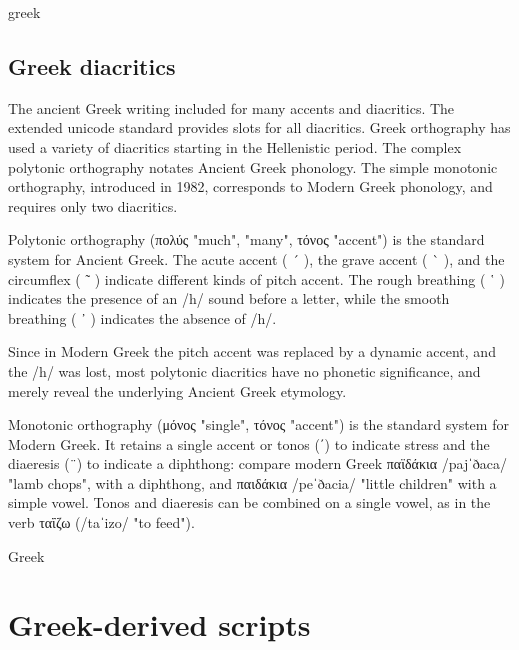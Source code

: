 {\small
\begin{scriptexample}{greek}
\end{scriptexample}
}

\subsection{Greek diacritics}

The ancient Greek writing included for many accents and diacritics. The extended unicode standard provides slots for all diacritics. Greek orthography has used a variety of diacritics starting in the Hellenistic period. The complex polytonic orthography notates Ancient Greek phonology. The simple monotonic orthography, introduced in 1982, corresponds to Modern Greek phonology, and requires only two diacritics.

Polytonic orthography (πολύς "much", "many", τόνος "accent") is the standard system for Ancient Greek. The acute accent ( ´ ), the grave accent ( ` ), and the circumflex ( ῀ ) indicate different kinds of pitch accent. The rough breathing ( ῾ ) indicates the presence of an /h/ sound before a letter, while the smooth breathing ( ᾿ ) indicates the absence of /h/.

Since in Modern Greek the pitch accent was replaced by a dynamic accent, and the /h/ was lost, most polytonic diacritics have no phonetic significance, and merely reveal the underlying Ancient Greek etymology.

Monotonic orthography (μόνος "single", τόνος "accent") is the standard system for Modern Greek. It retains a single accent or tonos (΄) to indicate stress and the diaeresis (¨) to indicate a diphthong: compare modern Greek παϊδάκια /pajˈðaca/ "lamb chops", with a diphthong, and παιδάκια /peˈðacia/ "little children" with a simple vowel. Tonos and diaeresis can be combined on a single vowel, as in the verb ταΐζω (/taˈizo/ "to feed").

\medskip
\begin{scriptexample}[]{Greek}
\end{scriptexample}




\section{Greek-derived scripts}

